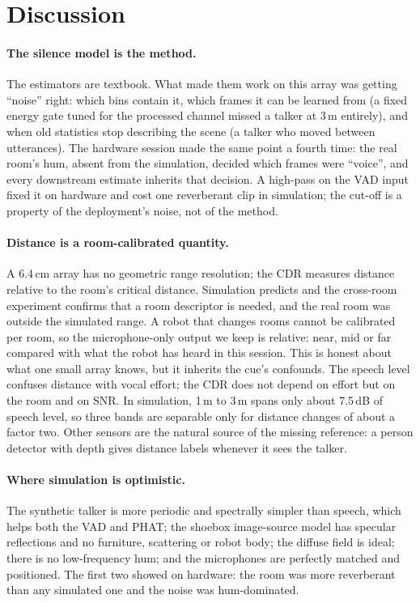 \section{Discussion}

\paragraph{The silence model is the method.} The estimators are textbook.
What made them work on this array was getting ``noise'' right: which bins
contain it, which frames it can be learned from (a fixed energy gate tuned
for the processed channel missed a talker at 3\,m entirely), and when old
statistics stop describing the scene (a talker who moved between
utterances). The hardware session made the same point a fourth time: the
real room's hum, absent from the simulation, decided which frames were
``voice'', and every downstream estimate inherits that decision. A
high-pass on the VAD input fixed it on hardware and cost one reverberant
clip in simulation; the cut-off is a property of the deployment's noise,
not of the method.

\paragraph{Distance is a room-calibrated quantity.} A 6.4\,cm array has no
geometric range resolution; the CDR measures distance relative to the
room's critical distance. Simulation predicts and the cross-room
experiment confirms that a room descriptor is needed, and the real room
was outside the simulated range. A robot that changes rooms cannot be
calibrated per room, so the microphone-only output we keep is relative:
near, mid or far compared with what the robot has heard in this session.
This is honest about what one small array knows, but it inherits the
cue's confounds. The speech level confuses distance with vocal effort; the
CDR does not depend on effort but on the room and on SNR. In simulation,
1\,m to 3\,m spans only about 7.5\,dB of speech level, so three bands are
separable only for distance changes of about a factor two. Other sensors
are the natural source of the missing reference: a person detector with
depth gives distance labels whenever it sees the talker.

\paragraph{Where simulation is optimistic.} The synthetic talker is more
periodic and spectrally simpler than speech, which helps both the VAD and
PHAT; the shoebox image-source model has specular reflections and no
furniture, scattering or robot body; the diffuse field is ideal; there is no
low-frequency hum; and the microphones are perfectly matched and positioned.
The first two showed on hardware: the room was more reverberant than any
simulated one and the noise was hum-dominated.

